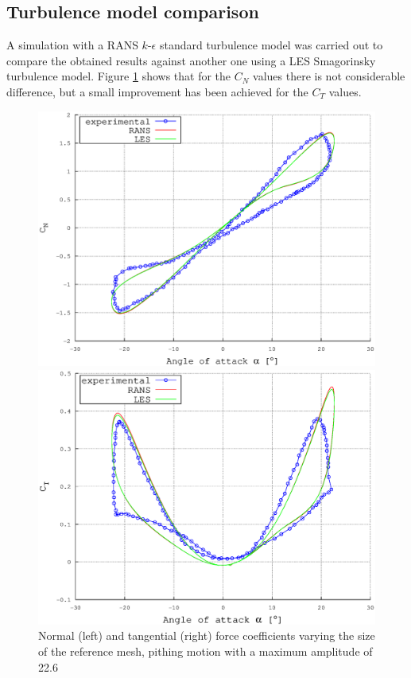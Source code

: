 \documentclass[a4paper]{jpconf}
\begin{document}
\subsection{Turbulence model comparison}
A simulation with a RANS $k$-$\epsilon$ standard turbulence model was carried out to compare the obtained results against another one using a LES Smagorinsky turbulence model. Figure \ref{RANSLES} shows that for the $C_N$ values there is not considerable difference, but a small improvement has been achieved for the $C_T$ values. 

\begin{figure}[h]
\begin{minipage}{18pc}
\includegraphics[width=\columnwidth]{CNRANSLES.eps}
\end{minipage}\hspace{2pc}%
\begin{minipage}{18pc}
\includegraphics[width=\columnwidth]{CTRANSLES.eps}
\end{minipage} 
\caption{\label{RANSLES}Normal (left) and tangential (right) force coefficients varying the size of the reference mesh, pithing motion with a maximum amplitude of 22.6\degree\ }
\end{figure}
\end{document}
